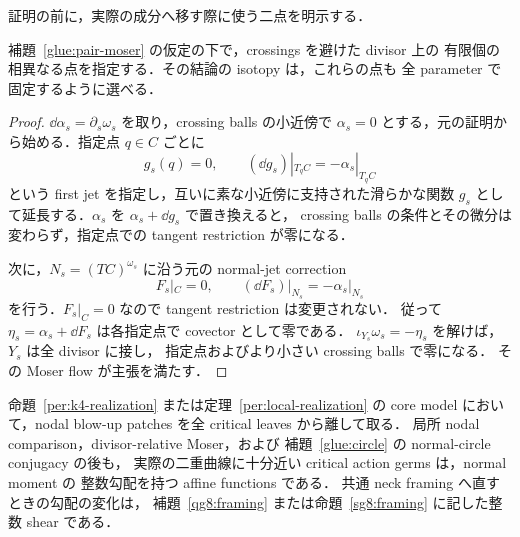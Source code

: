 証明の前に，実際の成分へ移す際に使う二点を明示する．

\begin{lemma}
\label{ga8:fixed-q}
補題~\ref{glue:pair-moser} の仮定の下で，crossings を避けた divisor 上の
有限個の相異なる点を指定する．その結論の isotopy は，これらの点も
全 parameter で固定するように選べる．
\end{lemma}

\begin{proof}
$\dd\alpha_s=\partial_s\omega_s$ を取り，crossing balls の小近傍で
$\alpha_s=0$ とする，元の証明から始める．指定点 $q\in C$ ごとに
\[
 g_s(q)=0,\qquad
 (\dd g_s)|_{T_qC}=-\alpha_s|_{T_qC}
\]
という first jet を指定し，互いに素な小近傍に支持された滑らかな関数
$g_s$ として延長する．$\alpha_s$ を $\alpha_s+\dd g_s$ で置き換えると，
crossing balls の条件とその微分は変わらず，指定点での tangent restriction が零になる．

次に，$N_s=(TC)^{\omega_s}$ に沿う元の normal-jet correction
\[
 F_s|_C=0,\qquad (\dd F_s)|_{N_s}=-\alpha_s|_{N_s}
\]
を行う．$F_s|_C=0$ なので tangent restriction は変更されない．
従って $\eta_s=\alpha_s+\dd F_s$ は各指定点で covector として零である．
$\iota_{Y_s}\omega_s=-\eta_s$ を解けば，$Y_s$ は全 divisor に接し，
指定点およびより小さい crossing balls で零になる．
その Moser flow が主張を満たす．
\end{proof}

\begin{lemma}
\label{ga8:affine-persistence}
命題~\ref{per:k4-realization} または定理~\ref{per:local-realization} の
core model において，nodal blow-up patches を全 critical leaves から離して取る．
局所 nodal comparison，divisor-relative Moser，および
補題~\ref{glue:circle} の normal-circle conjugacy の後も，
実際の二重曲線に十分近い critical action germs は，normal moment の
整数勾配を持つ affine functions である．
共通 neck framing へ直すときの勾配の変化は，
補題~\ref{qg8:framing} または命題~\ref{sg8:framing} に記した整数 shear である．
\end{lemma}

